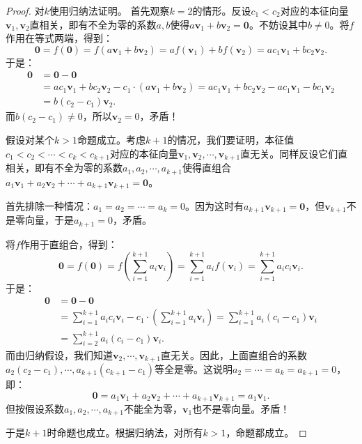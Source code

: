 \documentclass[12pt,UTF8]{ctexbook}
\begin{document}
\begin{proof}
    对$k$使用归纳法证明。
    首先观察$k=2$的情形。反设$c_1<c_2$对应的本征向量$\mathbf{v}_1,\mathbf{v}_2$直相关，即有不全为零的系数$a,b$使得$a\mathbf{v}_1+b\mathbf{v}_2=\mathbf{0}$。不妨设其中$b\neq 0$。将$f$作用在等式两端，得到：
    $$ \mathbf{0} = f(\mathbf{0}) = f(a\mathbf{v}_1+b\mathbf{v}_2) = af(\mathbf{v}_1)+bf(\mathbf{v}_2) = ac_1\mathbf{v}_1+bc_2\mathbf{v}_2.$$
    于是：
    \begin{align*}
        \mathbf{0} &= \mathbf{0} - \mathbf{0} \\
        &= ac_1\mathbf{v}_1+bc_2\mathbf{v}_2 - c_1\cdot(a\mathbf{v}_1+b\mathbf{v}_2) = ac_1\mathbf{v}_1+bc_2\mathbf{v}_2-ac_1\mathbf{v}_1-bc_1\mathbf{v}_2 \\
        &= b(c_2 - c_1)\mathbf{v}_2.
    \end{align*}
    而$b(c_2 - c_1)\neq 0$，所以$\mathbf{v}_2 = 0$，矛盾！

    假设对某个$k>1$命题成立。考虑$k+1$的情况，我们要证明，本征值$c_1<c_2<\cdots<c_k<c_{k+1}$对应的本征向量$\mathbf{v}_1,\mathbf{v}_2,\cdots,\mathbf{v}_{k+1}$直无关。同样反设它们直相关，即有不全为零的系数$a_1,a_2,\cdots,a_{k+1}$使得直组合$a_1\mathbf{v}_1+a_2\mathbf{v}_2+\cdots+a_{k+1}\mathbf{v}_{k+1}=\mathbf{0}$。
    
    首先排除一种情况：$a_1=a_2=\cdots=a_{k}=0$。因为这时有$a_{k+1}\mathbf{v}_{k+1}=\mathbf{0}$，但$\mathbf{v}_{k+1}$不是零向量，于是$a_{k+1}=0$，矛盾。
    
    将$f$作用于直组合，得到：
    $$ \mathbf{0} = f(\mathbf{0}) = f\left(\sum_{i=1}^{k+1} a_i \mathbf{v}_i\right) = \sum_{i=1}^{k+1} a_i f(\mathbf{v}_i) = \sum_{i=1}^{k+1} a_ic_i\mathbf{v}_i.$$
    于是：
    \begin{align*}
        \mathbf{0} &= \mathbf{0} - \mathbf{0} \\
        &= \sum_{i=1}^{k+1} a_ic_i\mathbf{v}_i - c_1\cdot\left( \sum_{i=1}^{k+1} a_i\mathbf{v} _i\right) = \sum_{i=1}^{k+1} a_i(c_i - c_1)\mathbf{v}_i \\
        &= \sum_{i=2}^{k+1} a_i(c_i - c_1)\mathbf{v}_i.
    \end{align*}
    而由归纳假设，我们知道$\mathbf{v}_2,\cdots,\mathbf{v}_{k+1}$直无关。因此，上面直组合的系数$a_2(c_2-c_1),\cdots,a_{k+1}(c_{k+1}-c_1)$等全是零。这说明$a_2=\cdots=a_k=a_{k+1}=0$，即：
    $$\mathbf{0} = a_1\mathbf{v}_1+a_2\mathbf{v}_2+\cdots+a_{k+1}\mathbf{v}_{k+1} = a_1\mathbf{v}_1.$$
    但按假设系数$a_1,a_2,\cdots,a_{k+1}$不能全为零，$\mathbf{v}_1$也不是零向量。矛盾！

    于是$k+1$时命题也成立。根据归纳法，对所有$k>1$，命题都成立。
\end{proof}
\end{document}
